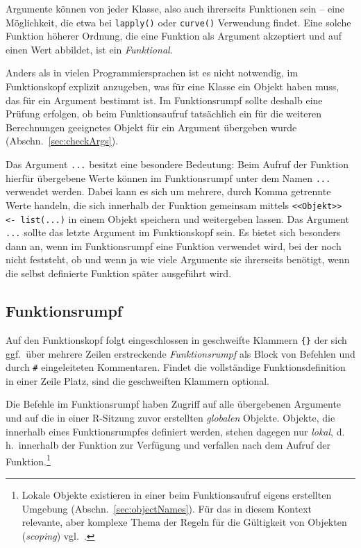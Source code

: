 Argumente können von jeder Klasse, also auch ihrerseits Funktionen sein -- eine Möglichkeit, die etwa bei \lstinline!lapply()! oder \lstinline!curve()! Verwendung findet. Eine solche Funktion höherer Ordnung, die eine Funktion als Argument akzeptiert und auf einen Wert abbildet, ist ein \emph{Funktional}.

Anders als in vielen Programmiersprachen ist es nicht notwendig, im Funktionskopf explizit anzugeben, was für eine Klasse ein Objekt haben muss, das für ein Argument bestimmt ist. Im Funktionsrumpf sollte deshalb eine Prüfung erfolgen, ob beim Funktionsaufruf tatsächlich ein für die weiteren Berechnungen geeignetes Objekt für ein Argument übergeben wurde (Abschn.\ \ref{sec:checkArgs}).

Das Argument \lstinline!...! besitzt eine besondere Bedeutung: Beim Aufruf der Funktion hierfür übergebene Werte können im Funktionsrumpf unter dem Namen \lstinline!...! verwendet werden. Dabei kann es sich um mehrere, durch Komma getrennte Werte handeln, die sich innerhalb der Funktion gemeinsam mittels \lstinline!<<Objekt>> <- list(...)! in einem Objekt speichern und weitergeben lassen. Das Argument \lstinline!...! sollte das letzte Argument im Funktionskopf sein. Es bietet sich besonders dann an, wenn im Funktionsrumpf eine Funktion verwendet wird, bei der noch nicht feststeht, ob und wenn ja wie viele Argumente sie ihrerseits benötigt, wenn die selbst definierte Funktion später ausgeführt wird.

\subsection{Funktionsrumpf}
\label{sec:funcBody}

Auf den Funktionskopf folgt eingeschlossen in geschweifte Klammern \lstinline!{}! der sich ggf.\ über mehrere Zeilen erstreckende \emph{Funktionsrumpf} als Block von Befehlen und durch \lstinline!#! eingeleiteten Kommentaren. Findet die vollständige Funktionsdefinition in einer Zeile Platz, sind die geschweiften Klammern optional.

Die Befehle im Funktionsrumpf haben Zugriff auf alle übergebenen Argumente und auf die in einer R-Sitzung zuvor erstellten \emph{globalen} Objekte. Objekte, die innerhalb eines Funktionsrumpfes definiert werden, stehen dagegen nur \emph{lokal}, d.\,h.\ innerhalb der Funktion zur Verfügung und verfallen nach dem Aufruf der Funktion.\footnote{Lokale Objekte existieren in einer beim Funktionsaufruf eigens erstellten Umgebung (Abschn.\ \ref{sec:objectNames}). Für das in diesem Kontext relevante, aber komplexe Thema der Regeln für die Gültigkeit von Objekten (\emph{scoping}) vgl.\ .}

